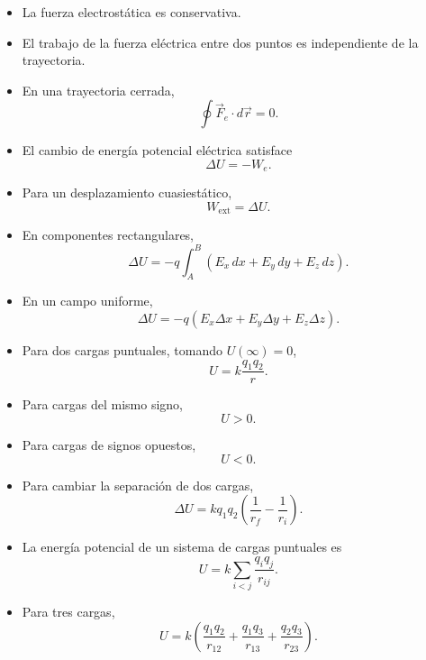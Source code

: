 \begin{resumen}

\begin{itemize}
    \item La fuerza electrostática es conservativa.

    \item El trabajo de la fuerza eléctrica entre dos puntos es independiente de la
    trayectoria.

    \item En una trayectoria cerrada,
    \[
    \boxed{\oint\vec F_e\cdot d\vec r=0}.
    \]

    \item El cambio de energía potencial eléctrica satisface
    \[
    \boxed{\Delta U=-W_e}.
    \]

    \item Para un desplazamiento cuasiestático,
    \[
    \boxed{W_{\text{ext}}=\Delta U}.
    \]

    \item En componentes rectangulares,
    \[
    \boxed{
    \Delta U
    =
    -q\int_A^B
    (E_x\,dx+E_y\,dy+E_z\,dz)
    }.
    \]

    \item En un campo uniforme,
    \[
    \boxed{
    \Delta U
    =
    -q(E_x\Delta x+E_y\Delta y+E_z\Delta z)
    }.
    \]

    \item Para dos cargas puntuales, tomando \(U(\infty)=0\),
    \[
    \boxed{U=k\frac{q_1q_2}{r}}.
    \]

    \item Para cargas del mismo signo,
    \[
    \boxed{U>0}.
    \]

    \item Para cargas de signos opuestos,
    \[
    \boxed{U<0}.
    \]

    \item Para cambiar la separación de dos cargas,
    \[
    \boxed{
    \Delta U
    =
    kq_1q_2
    \left(
    \frac{1}{r_f}-\frac{1}{r_i}
    \right)
    }.
    \]

    \item La energía potencial de un sistema de cargas puntuales es
    \[
    \boxed{
    U
    =
    k\sum_{i<j}
    \frac{q_iq_j}{r_{ij}}
    }.
    \]

    \item Para tres cargas,
    \[
    \boxed{
    U
    =
    k
    \left(
    \frac{q_1q_2}{r_{12}}
    +
    \frac{q_1q_3}{r_{13}}
    +
    \frac{q_2q_3}{r_{23}}
    \right)
    }.
    \]


\end{itemize}
\end{resumen}

